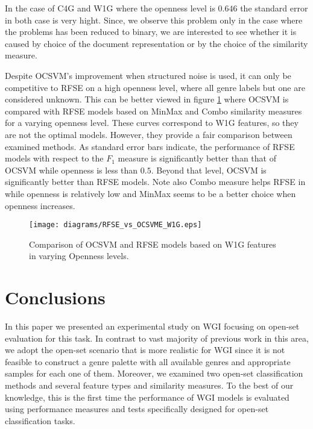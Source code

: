 \documentclass[runningheads]{llncs}
\begin{document}
In the case of C4G and W1G where the openness level is $0.646$ the standard error in both case is very hight. Since, we observe this problem only in the case where the problems has been reduced to binary, we are interested to see whether it is caused by choice of the document representation or by the choice of the similarity measure.


Despite OCSVM's improvement when structured noise is used, it can only be competitive to RFSE on a high openness level, where all genre labels but one are considered unknown. This can be better viewed in figure \ref{fig:RFSE_vs_OCSVME_W1G_openness_test} where OCSVM is compared with RFSE models based on MinMax and Combo similarity measures for a varying openness level. These curves correspond to W1G features, so they are not the optimal models. However, they provide a fair comparison between examined methods. As standard error bars indicate, the performance of RFSE models with respect to the $F_{1}$ measure is significantly better than that of OCSVM while openness is less than $0.5$. Beyond that level, OCSVM is significantly better than RFSE models. Note also Combo measure helps RFSE in while openness is relatively low and MinMax seems to be a better choice when openness increases.

\begin{figure}[H]
\begin{center}
    \texttt{[image: diagrams/RFSE\_vs\_OCSVME\_W1G.eps]}
	\caption{Comparison of OCSVM and RFSE models based on W1G features in varying Openness levels.}
	\label{fig:RFSE_vs_OCSVME_W1G_openness_test}
\end{center}
\end{figure}

\section{Conclusions}\label{sec:conclusions}

In this paper we presented an experimental study on WGI focusing on open-set evaluation for this task. In contrast to vast majority of previous work in this area, we adopt the open-set scenario that is more realistic for WGI since it is not feasible to construct a genre palette with all available genres and appropriate samples for each one of them. Moreover, we examined two open-set classification methods and several feature types and similarity measures. To the best of our knowledge, this is the first time the performance of WGI models is evaluated using performance measures and tests specifically designed for open-set classification tasks.
\end{document}

